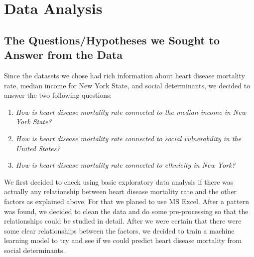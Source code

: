 \documentclass[journal,12pt,onecolumn]{IEEEtran}
\begin{document}
\section{Data Analysis}

\subsection{The Questions/Hypotheses we Sought to Answer from the Data}
Since the datasets we chose had rich information about heart disease mortality rate, median income for New York State, and social determinants, we decided to answer the two following questions:
\begin{enumerate}
\item \emph{How is heart disease mortality rate connected to the median income in New York State?}
\item \emph{How is heart disease mortality rate connected to social vulnerability in the United States?}
\item \emph{How is heart disease mortality rate connected to ethnicity in New York?}
\end{enumerate} 

We first decided to check using basic exploratory data analysis if there was actually any relationship between heart disease mortality rate and the other factors as explained above.  
For that we planed to use MS Excel.
After a pattern was found, we decided to clean the data and do some pre-processing so that the relationships could be studied in detail.
After we were certain that there were some clear relationships between the factors, we decided to train a machine learning model to try and see if we could predict heart disease mortality from social determinants.
\end{document}
